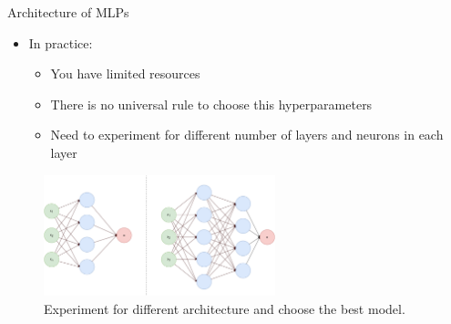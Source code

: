 \documentclass[compress,oilve,t]{beamer}
\begin{document}
\begin{frame}{Architecture of MLPs}
	\begin{itemize}
		\item In practice:
		\begin{itemize}
			\item You have limited resources
			\item There is no universal rule to choose this hyperparameters
			\item Need to experiment for different number of layers and neurons in each layer
		\end{itemize}
	\end{itemize}
	\begin{figure}[H]
		\centering
		\includegraphics[width=0.6\textwidth]{Figs/experiment_arch.png}
		\caption{Experiment for different architecture and choose the best model.}
	\end{figure}
\end{frame}
\end{document}
